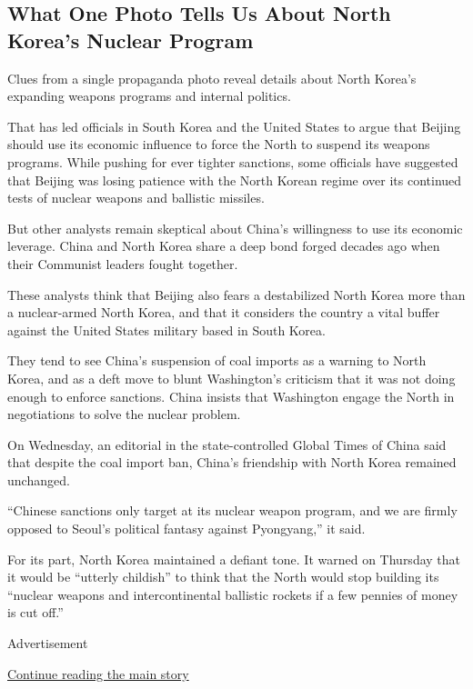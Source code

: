 \hypertarget{what-one-photo-tells-us-about-north-koreas-nuclear-program}{%
\subsection{What One Photo Tells Us About North Korea's Nuclear
Program}\label{what-one-photo-tells-us-about-north-koreas-nuclear-program}}

Clues from a single propaganda photo reveal details about North Korea's
expanding weapons programs and internal politics.

That has led officials in South Korea and the United States to argue
that Beijing should use its economic influence to force the North to
suspend its weapons programs. While pushing for ever tighter sanctions,
some officials have suggested that Beijing was losing patience with the
North Korean regime over its continued tests of nuclear weapons and
ballistic missiles.

But other analysts remain skeptical about China's willingness to use its
economic leverage. China and North Korea share a deep bond forged
decades ago when their Communist leaders fought together.

These analysts think that Beijing also fears a destabilized North Korea
more than a nuclear-armed North Korea, and that it considers the country
a vital buffer against the United States military based in South Korea.

They tend to see China's suspension of coal imports as a warning to
North Korea, and as a deft move to blunt Washington's criticism that it
was not doing enough to enforce sanctions. China insists that Washington
engage the North in negotiations to solve the nuclear problem.

On Wednesday, an editorial in the state-controlled Global Times of China
said that despite the coal import ban, China's friendship with North
Korea remained unchanged.

``Chinese sanctions only target at its nuclear weapon program, and we
are firmly opposed to Seoul's political fantasy against Pyongyang,'' it
said.

For its part, North Korea maintained a defiant tone. It warned on
Thursday that it would be ``utterly childish'' to think that the North
would stop building its ``nuclear weapons and intercontinental ballistic
rockets if a few pennies of money is cut off.''

Advertisement

\protect\hyperlink{after-bottom}{Continue reading the main story}

